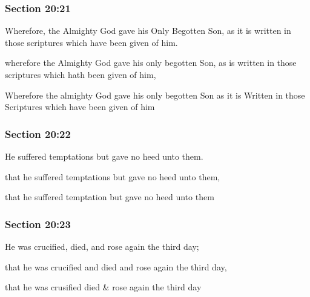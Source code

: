 	\subsubsection{Section 20:21} %
		\label{DC20-21}

		Wherefore, the Almighty God gave his Only Begotten Son, as it is written in those scriptures which have been given of him.

		\begin{framed}
		\scriptsize
			\begin{compactdesc}
				\item[JSP] wherefore the Almighty God gave his only begotten Son, as is written in those scriptures which hath been given of him,
				\item[RB1] Wherefore the almighty God gave his only begotten Son as it is Written in those Scriptures which have been given of him
			\end{compactdesc}
		\end{framed}

	\subsubsection{Section 20:22} %
		\label{DC20-22}

		He suffered temptations but gave no heed unto them.

		\begin{framed}
		\scriptsize
			\begin{compactdesc}
				\item[JSP] that he suffered temptations but gave no heed unto them,
				\item[RB1] that he suffered temptation but gave no heed unto them
			\end{compactdesc}
		\end{framed}

	\subsubsection{Section 20:23} %
		\label{DC20-23}

		He was crucified, died, and rose again the third day;

		\begin{framed}
		\scriptsize
			\begin{compactdesc}
				\item[JSP] that he was crucified and died and rose again the third day,
				\item[RB1] that he was crusified died \& rose again the third day
			\end{compactdesc}
		\end{framed}

